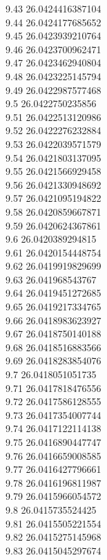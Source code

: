 {9.43	26.0424416387104\\
9.44	26.0424177685652\\
9.45	26.0423939210764\\
9.46	26.0423700962471\\
9.47	26.0423462940804\\
9.48	26.0423225145794\\
9.49	26.0422987577468\\
9.5	26.0422750235856\\
9.51	26.0422513120986\\
9.52	26.0422276232884\\
9.53	26.0422039571579\\
9.54	26.0421803137095\\
9.55	26.0421566929458\\
9.56	26.0421330948692\\
9.57	26.0421095194822\\
9.58	26.0420859667871\\
9.59	26.0420624367861\\
9.6	26.0420389294815\\
9.61	26.0420154448754\\
9.62	26.0419919829699\\
9.63	26.041968543767\\
9.64	26.0419451272685\\
9.65	26.0419217334765\\
9.66	26.0418983623927\\
9.67	26.0418750140188\\
9.68	26.0418516883566\\
9.69	26.0418283854076\\
9.7	26.0418051051735\\
9.71	26.0417818476556\\
9.72	26.0417586128555\\
9.73	26.0417354007744\\
9.74	26.0417122114138\\
9.75	26.0416890447747\\
9.76	26.0416659008585\\
9.77	26.0416427796661\\
9.78	26.0416196811987\\
9.79	26.0415966054572\\
9.8	26.0415735524425\\
9.81	26.0415505221554\\
9.82	26.0415275145968\\
9.83	26.0415045297674\\
}
